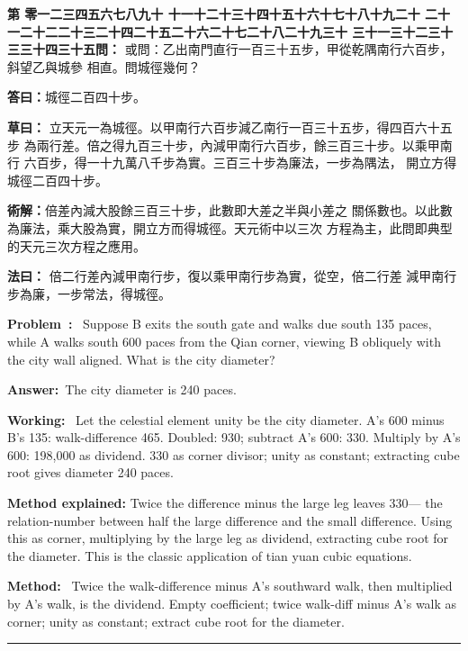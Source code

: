 \documentclass[9pt,a4paper]{article}
\newcounter{probnum}
\newcounter{overallnum}
\newcommand{\chnum}[1]{%
  \ifcase#1 零\or 一\or 二\or 三\or 四\or 五\or 六\or 七\or 八\or 九\or 十\or
    十一\or 十二\or 十三\or 十四\or 十五\or 十六\or 十七\or 十八\or 十九\or 二十\or
    二十一\or 二十二\or 二十三\or 二十四\or 二十五\or 二十六\or 二十七\or 二十八\or 二十九\or 三十\or
    三十一\or 三十二\or 三十三\or 三十四\or 三十五\fi}
\newcommand{\problem}[1]{\stepcounter{probnum}\stepcounter{overallnum}\par\noindent\textbf{\color{volcolor}第\chnum{\value{probnum}}問：}#1\par\vspace{0.15cm}}
\newcommand{\answer}[1]{\par\noindent\textbf{答曰：}#1\par\vspace{0.15cm}}
\newcommand{\working}[1]{\par\noindent\textbf{草曰：}#1\par\vspace{0.15cm}}
\newcommand{\method}[1]{\par\noindent\textbf{法曰：}#1\par\vspace{0.25cm}}
\newcommand{\eproblem}[1]{\par\noindent\textbf{\color{volcolor}Problem~\theoverallnum:}~#1\par\vspace{0.15cm}}
\newcommand{\eanswer}[1]{\par\noindent\textbf{Answer:}~#1\par\vspace{0.15cm}}
\newcommand{\eworking}[1]{\par\noindent\textbf{Working:}~#1\par\vspace{0.15cm}}
\newcommand{\emethod}[1]{\par\noindent\textbf{Method:}~#1\par\vspace{0.25cm}}
\begin{document}
\noindent\begin{minipage}[t]{0.48\textwidth}
\problem{
或問：乙出南門直行一百三十五步，甲從乾隅南行六百步，斜望乙與城參
相直。問城徑幾何？
}

\answer{城徑二百四十步。}

\working{
立天元一為城徑。以甲南行六百步減乙南行一百三十五步，得四百六十五步
為兩行差。倍之得九百三十步，內減甲南行六百步，餘三百三十步。以乘甲南行
六百步，得一十九萬八千步為實。三百三十步為廉法，一步為隅法，
開立方得城徑二百四十步。

\textbf{術解：}倍差內減大股餘三百三十步，此數即大差之半與小差之
關係數也。以此數為廉法，乘大股為實，開立方而得城徑。天元術中以三次
方程為主，此問即典型的天元三次方程之應用。
}

\method{
倍二行差內減甲南行步，復以乘甲南行步為實，從空，倍二行差
減甲南行步為廉，一步常法，得城徑。
}
\end{minipage}%
\hfill%
\begin{minipage}[t]{0.50\textwidth}
\eproblem{
Suppose B exits the south gate and walks due south 135 paces, while A walks
south 600 paces from the Qian corner, viewing B obliquely with the city wall
aligned. What is the city diameter?
}

\eanswer{The city diameter is 240 paces.}

\eworking{
Let the celestial element unity be the city diameter. A's 600 minus B's 135:
walk-difference 465. Doubled: 930; subtract A's 600: 330. Multiply by A's
600: 198,000 as dividend. 330 as corner divisor; unity as constant;
extracting cube root gives diameter 240 paces.

\textbf{Method explained:} Twice the difference minus the large leg leaves 330---
the relation-number between half the large difference and the small difference.
Using this as corner, multiplying by the large leg as dividend, extracting cube
root for the diameter. This is the classic application of tian yuan cubic
equations.
}

\emethod{
Twice the walk-difference minus A's southward walk, then multiplied by A's
walk, is the dividend. Empty coefficient; twice walk-diff minus A's walk as
corner; unity as constant; extract cube root for the diameter.
}
\end{minipage}
\vspace{0.15cm}

\vspace{0.15cm}
\noindent\rule{\textwidth}{0.2pt}
\vspace{0.15cm}
\end{document}
